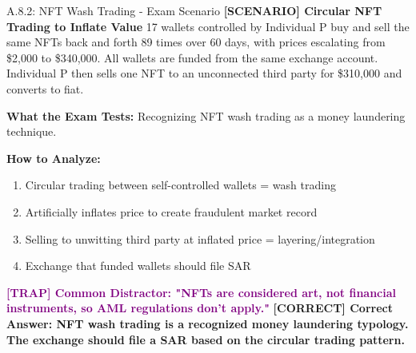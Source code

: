 \documentclass[11pt,a4paper]{beamer}
\newcommand{\trap}[1]{\textcolor{purple}{\textbf{[TRAP] #1}}}
\newcommand{\correct}[1]{\textcolor{green!50!black}{\textbf{[CORRECT] #1}}}
\newcommand{\scenario}[1]{\textcolor{blue!70!black}{\textbf{[SCENARIO] #1}}}
\begin{document}
	\begin{frame}{A.8.2: NFT Wash Trading - Exam Scenario}
		\scenario{Circular NFT Trading to Inflate Value}
		17 wallets controlled by Individual P buy and sell the same NFTs back and forth 89 times over 60 days, with prices escalating from \$2,000 to \$340,000. All wallets are funded from the same exchange account. Individual P then sells one NFT to an unconnected third party for \$310,000 and converts to fiat.
		
		\vspace{0.1cm}
		\textbf{What the Exam Tests:} Recognizing NFT wash trading as a money laundering technique.
		
		\vspace{0.1cm}
		\textbf{How to Analyze:}
		\begin{enumerate}
			\item Circular trading between self-controlled wallets = wash trading
			\item Artificially inflates price to create fraudulent market record
			\item Selling to unwitting third party at inflated price = layering/integration
			\item Exchange that funded wallets should file SAR
		\end{enumerate}
		
		\trap{Common Distractor: "NFTs are considered art, not financial instruments, so AML regulations don't apply."}
		\correct{Correct Answer: NFT wash trading is a recognized money laundering typology. The exchange should file a SAR based on the circular trading pattern.}
	\end{frame}
	
	
\end{document}

